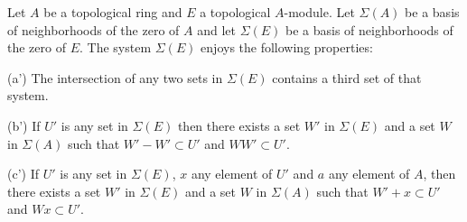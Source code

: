 Let $A$ be a topological ring and $E$ a topological $A$-module. Let $\Sigma(A)$ be a basis of neighborhoods of the zero of $A$ and let $\Sigma(E)$ be a basis of neighborhoods of the zero of $E$. The system $\Sigma(E)$ enjoys the following properties:

(a') The intersection of any two sets in $\Sigma(E)$ contains a third set of that system.

(b') If $U'$ is any set in $\Sigma(E)$ then there exists a set $W'$ in $\Sigma(E)$ and a set $W$ in $\Sigma(A)$ such that $W' - W' \subset U'$ and $WW' \subset U'$.

(c') If $U'$ is any set in $\Sigma(E)$, $x$ any element of $U'$ and $a$ any element of $A$, then there exists a set $W'$ in $\Sigma(E)$ and a set $W$ in $\Sigma(A)$ such that $W' + x \subset U'$ and $Wx \subset U'$.